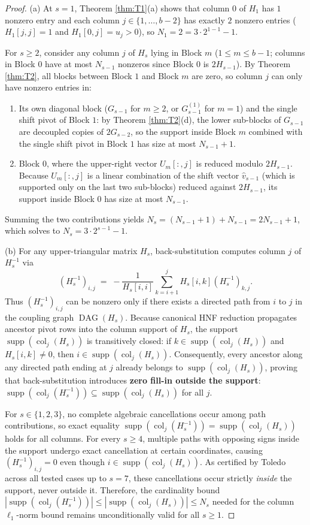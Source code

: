 \documentclass[11pt,a4paper]{article}
\theoremstyle{plain}
\theoremstyle{definition}
\newcommand{\supp}{\operatorname{supp}}
\newcommand{\DAG}{\operatorname{DAG}}
\newcommand{\col}{\operatorname{col}}
\begin{document}
\begin{proof}
(a) At $s = 1$, Theorem \ref{thm:T1}(a) shows that column $0$ of $H_1$ has $1$ nonzero entry and each column $j \in \{1, \dots, b-2\}$ has exactly $2$ nonzero entries ($H_1[j,j] = 1$ and $H_1[0,j] = u_j > 0$), so $N_1 = 2 = 3 \cdot 2^{1-1} - 1$.

For $s \ge 2$, consider any column $j$ of $H_s$ lying in Block $m$ ($1 \le m \le b-1$; columns in Block $0$ have at most $N_{s-1}$ nonzeros since Block $0$ is $2H_{s-1}$). By Theorem \ref{thm:T2}, all blocks between Block $1$ and Block $m$ are zero, so column $j$ can only have nonzero entries in:
\begin{enumerate}[nosep]
\item Its own diagonal block ($G_{s-1}$ for $m \ge 2$, or $G_{s-1}^{(1)}$ for $m = 1$) and the single shift pivot of Block $1$: by Theorem \ref{thm:T2}(d), the lower sub-blocks of $G_{s-1}$ are decoupled copies of $2 G_{s-2}$, so the support inside Block $m$ combined with the single shift pivot in Block $1$ has size at most $N_{s-1} + 1$.
\item Block $0$, where the upper-right vector $U_m[:,j]$ is reduced modulo $2 H_{s-1}$. Because $U_m[:,j]$ is a linear combination of the shift vector $\hat{v}_{s-1}$ (which is supported only on the last two sub-blocks) reduced against $2 H_{s-1}$, its support inside Block $0$ has size at most $N_{s-1}$.
\end{enumerate}
Summing the two contributions yields $N_s = (N_{s-1} + 1) + N_{s-1} = 2 N_{s-1} + 1$, which solves to $N_s = 3 \cdot 2^{s-1} - 1$.

(b) For any upper-triangular matrix $H_s$, back-substitution computes column $j$ of $H_s^{-1}$ via
\[
(H_s^{-1})_{i,j} \;=\; -\frac{1}{H_s[i,i]} \sum_{k=i+1}^j H_s[i,k] (H_s^{-1})_{k,j}.
\]
Thus $(H_s^{-1})_{i,j}$ can be nonzero only if there exists a directed path from $i$ to $j$ in the coupling graph $\DAG(H_s)$. Because canonical HNF reduction propagates ancestor pivot rows into the column support of $H_s$, the support $\supp(\col_j(H_s))$ is transitively closed: if $k \in \supp(\col_j(H_s))$ and $H_s[i,k] \neq 0$, then $i \in \supp(\col_j(H_s))$. Consequently, every ancestor along any directed path ending at $j$ already belongs to $\supp(\col_j(H_s))$, proving that back-substitution introduces \textbf{zero fill-in outside the support}: $\supp(\col_j(H_s^{-1})) \subseteq \supp(\col_j(H_s))$ for all $j$.

For $s \in \{1, 2, 3\}$, no complete algebraic cancellations occur among path contributions, so exact equality $\supp(\col_j(H_s^{-1})) = \supp(\col_j(H_s))$ holds for all columns. For every $s \ge 4$, multiple paths with opposing signs inside the support undergo exact cancellation at certain coordinates, causing $(H_s^{-1})_{i,j} = 0$ even though $i \in \supp(\col_j(H_s))$. As certified by Toledo \cite{ToledoCert26} across all tested cases up to $s = 7$, these cancellations occur strictly \emph{inside} the support, never outside it. Therefore, the cardinality bound $|\supp(\col_j(H_s^{-1}))| \le |\supp(\col_j(H_s))| \le N_s$ needed for the column $\ell_1$-norm bound remains unconditionally valid for all $s \ge 1$.
\end{proof}
\end{document}
